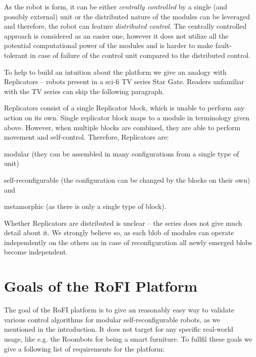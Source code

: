 As the robot is form, it can be either \emph{centrally controlled} by a single
(and possibly external) unit or the distributed nature of the modules can be
leveraged and therefore, the robot can feature \emph{distributed control}. The
centrally controlled approach is considered as an easier one, however it does
not utilize all the potential computational power of the modules and is harder
to make fault-tolerant in case of failure of the control unit compared to the
distributed control.

To help to build an intuition about the platform we give an analogy with
Replicators -- robots present in a sci-fi TV series Star Gate. Readers
unfamiliar with the TV series can skip the following paragraph.

Replicators consist of a single Replicator block, which is unable to perform any
action on its own. Single replicator block maps to a module in terminology given
above. However, when multiple blocks are combined, they are able to perform
movement and self-control. Therefore, Replicators are:
\begin{enumerate*}
    \item modular (they can be assembled in many configurations from a single
    type of unit)
    \item self-reconfigurable (the configuration can be changed by the blocks on
    their own) and
    \item metamorphic (as there is only a single type of block).
\end{enumerate*}
Whether Replicators are distributed is unclear -- the series does not give much
detail about it. We strongly believe so, as each blob of modules can operate
independently on the others an in case of reconfiguration all newly emerged
blobs become independent.

\section{Goals of the RoFI Platform}

The goal of the RoFI platform is to give an reasonably easy way to validate
various control algorithms for modular self-reconfigurable robots, as we
mentioned in the introduction. It does not target for any specific real-world
usage, like e.g. the Roombots\cite{bonardi_locomotion_2012} for being a smart
furniture. To fullfil these goals we give a following list of requirements for
the platform:

